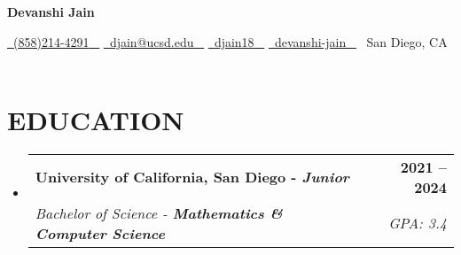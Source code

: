 \documentclass[letterpaper,11pt]{article}
\makeatletter
\newcommand{\resumeSubheading}[4]{
  \vspace{-2pt}\item
    \begin{tabular*}{1.0\textwidth}[t]{l@{\extracolsep{\fill}}r}
      \textbf{\large#1} & \textbf{\small #2} \\
      \textit{\large#3} & \textit{\small #4} \\
      
    \end{tabular*}\vspace{-7pt}
}
\newcommand{\resumeSubHeadingListStart}{\begin{itemize}[leftmargin=0.0in, label={}]}
\newcommand{\resumeSubHeadingListEnd}{\end{itemize}}
\makeatother
\begin{document}

    

\begin{center}
{\Huge \textbf{Devanshi Jain}} \\
\vspace{1pt}
\end{center}

\begin{center}
    \small 
    \href{tel:+1(858)214-4291}{\faPhone\ {(858)214-4291} ~} 
    \href{mailto:djain@ucsd.edu}{\faEnvelope\  \underline{djain@ucsd.edu} ~} 
    \href{https://linkedin.com/in/djain18}{\faLinkedin\ \underline{djain18} ~}
    \href{https://github.com/devanshi-jain}{\faGithub\ \underline{devanshi-jain} ~}
    {\faMapMarker\  {San Diego, CA}} ~ 
\end{center}


\section{EDUCATION}
  \resumeSubHeadingListStart
    \resumeSubheading
      {University of California, San Diego - \textit{\textbf{Junior}}}{2021 -- 2024}
      {Bachelor of Science - \textbf{Mathematics \& Computer Science}}{GPA: 3.4}
  \resumeSubHeadingListEnd
  
\end{document}
